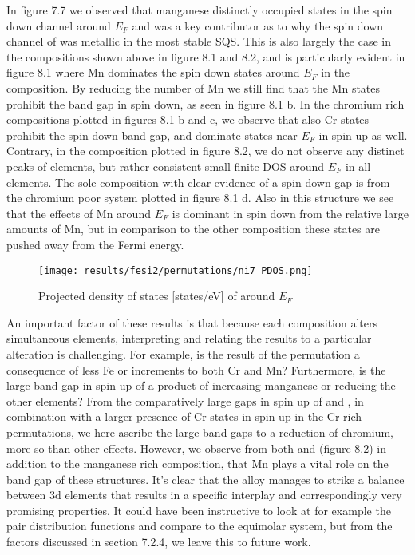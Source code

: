 In figure 7.7 we observed that manganese distinctly occupied states in the spin down channel around $E_F$ and was a key contributor as to why the spin down channel of  was metallic in the most stable SQS. This is also largely the case in the compositions shown above in figure 8.1 and 8.2, and is particularly evident in figure 8.1 where Mn dominates the spin down states around $E_F$ in the  composition. By reducing the number of Mn we still find that the Mn states prohibit the band gap in spin down, as seen in figure 8.1 b. In the chromium rich compositions plotted in figures 8.1 b and c, we observe that also Cr states prohibit the spin down band gap, and dominate states near $E_F$ in spin up as well. Contrary, in the  composition plotted in figure 8.2, we do not observe any distinct peaks of elements, but rather consistent small finite DOS around $E_F$ in all elements.  The sole composition with clear evidence of a spin down gap is from the chromium poor system plotted in figure 8.1 d. Also in this structure we see that the effects of Mn around $E_F$ is dominant in spin down from the relative large amounts of Mn, but in comparison to the other composition these states are pushed away from the Fermi energy.

\begin{figure}[H]
	\centering
	\texttt{[image: results/fesi2/permutations/ni7\_PDOS.png]}
	\caption{Projected density of states [states/eV] of  around $E_F$}
\end{figure}

An important factor of these results is that because each composition alters simultaneous elements, interpreting and relating the results to a particular alteration is challenging. For example, is the result of the  permutation a consequence of less Fe or increments to both Cr and Mn? Furthermore, is the large band gap in spin up of  a product of increasing manganese or reducing the other elements? From the comparatively large gaps in spin up of  and , in combination with a larger presence of Cr states in spin up in the Cr rich permutations, we here ascribe the large band gaps to a reduction of chromium, more so than other effects. However, we observe from both  and  (figure 8.2) in addition to the manganese rich composition, that Mn plays a vital role on the band gap of these structures. It's clear that the  alloy manages to strike a balance between 3d elements that results in a specific interplay and correspondingly very promising properties. It could have been instructive to look at for example the pair distribution functions and compare to the equimolar system, but from the factors discussed in section 7.2.4, we leave this to future work. 


